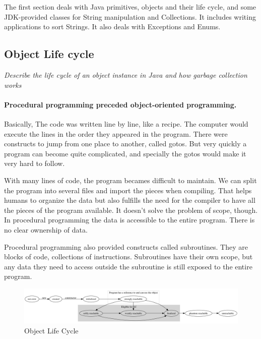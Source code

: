 \documentclass[fleqn,10pt]{SelfArx} %
\begin{document}
The first section deals with Java primitives, objects and their life cycle, and some JDK-provided classes for String manipulation and Collections. It includes writing applications to sort Strings. It also deals with Exceptions and Enums.

\subsection{Object Life cycle}
\begin{center}\textit{Describe the life cycle of an object instance in Java and how garbage collection works}\end{center}

\paragraph{Procedural programming preceded object-oriented programming.} Basically, The code was written line by line, like a recipe. The computer would execute the lines in the order they appeared in the program. There were constructs to jump from one place to another, called gotos. But very quickly a program can become quite complicated, and specially the gotos would make it very hard to follow. 

With many lines of code, the program becames difficult to maintain. We can split the program into several files and import the pieces when compiling. That helps humans to organize the data but also fulfills the need for the compiler to have all the pieces of the program available. It doesn't solve the problem of scope, though. In procedural programming the data is accessible to the entire program. There is no clear ownership of data.

Procedural programming also provided constructs called subroutines. They are blocks of code, collections of instructions. Subroutines have their own scope, but any data they need to access outside the subroutine is still exposed to the entire program.

\begin{figure}[ht]\centering %
\includegraphics[width=\linewidth]{object-life-cycle}
\caption{Object Life Cycle}
\label{fig:object-life-cycle}
\end{figure}
\end{document}

